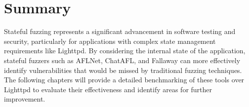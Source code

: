 \section{Summary}
Stateful fuzzing represents a significant advancement in software testing and security, particularly for applications with complex state management requirements like Lighttpd. By considering the internal state of the application, stateful fuzzers such as AFLNet, ChatAFL, and Fallaway can more effectively identify vulnerabilities that would be missed by traditional fuzzing techniques. The following chapters will provide a detailed benchmarking of these tools over Lighttpd to evaluate their effectiveness and identify areas for further improvement.
